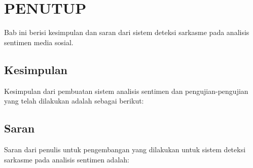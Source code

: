 \chapter{PENUTUP}

%
\vspace{4.5pt}
Bab ini berisi kesimpulan dan saran dari sistem deteksi sarkasme pada 
analisis sentimen media sosial. 
\section{Kesimpulan}
Kesimpulan dari pembuatan sistem analisis sentimen dan 
pengujian-pengujian yang telah dilakukan adalah sebagai berikut:

\section{Saran}
Saran dari penulis untuk pengembangan yang dilakukan untuk sistem deteksi sarkasme pada analisis sentimen adalah:

\newpage